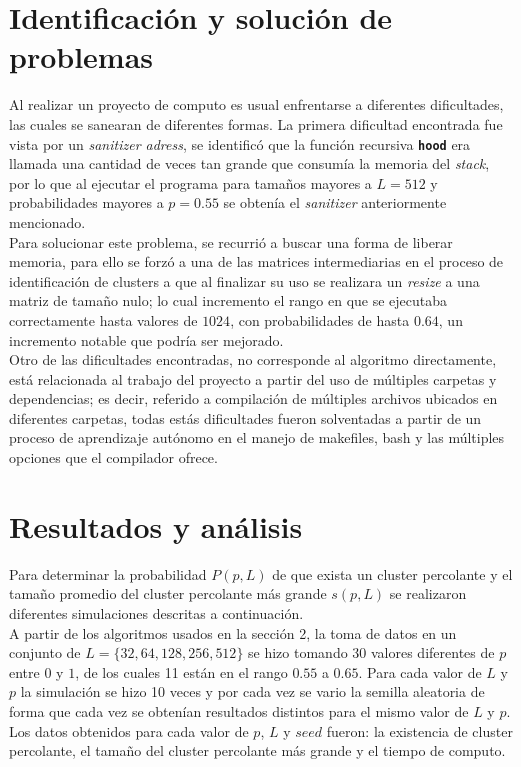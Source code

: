 \documentclass[11pt,twocolumn]{article}
\begin{document}
\section{\textbf{Identificación y solución de problemas}}
 \label{sec:problems}
 Al realizar un proyecto de computo es usual enfrentarse a diferentes dificultades, las cuales se sanearan de diferentes formas. La primera dificultad encontrada fue vista por un \textit{sanitizer adress}, se identificó que la función recursiva \texttt{\textbf{hood}} era llamada una cantidad de veces tan grande que consumía la memoria del \textit{stack}, por lo que al ejecutar el programa para tamaños mayores a $L=512$ y probabilidades mayores a $p=0.55$ se obtenía el \textit{sanitizer} anteriormente mencionado. \\
 Para solucionar este problema, se recurrió a buscar una forma de liberar memoria, para ello se forzó a una de las matrices intermediarias en el proceso de identificación de clusters a que al finalizar su uso se realizara un \textit{resize} a una matriz de tamaño nulo; lo cual incremento el rango en que se ejecutaba correctamente hasta valores de $1024$, con probabilidades de hasta $0.64$, un incremento notable que podría ser mejorado.\\
 Otro de las dificultades encontradas, no corresponde al algoritmo directamente, está relacionada al trabajo del proyecto a partir del uso de múltiples carpetas y dependencias; es decir, referido a compilación de múltiples archivos ubicados en diferentes carpetas, todas estás dificultades fueron solventadas a partir de un proceso de aprendizaje autónomo en el manejo de makefiles, bash y las múltiples opciones que el compilador ofrece.

\section{\textbf{Resultados y análisis}}
Para determinar la probabilidad $P(p,L)$ de que exista un cluster percolante y el tamaño promedio del cluster percolante más grande $s(p,L)$ se realizaron diferentes simulaciones descritas a continuación. \\
A partir de los algoritmos usados en la sección 2, la toma de datos en un conjunto de $L=\{32, 64, 128, 256, 512\}$ se hizo tomando 30 valores diferentes de $p$ entre $0$ y $1$, de los cuales 11 están en el rango $0.55$ a $0.65$. Para cada valor de $L$ y $p$ la simulación se hizo 10 veces y por cada vez se vario la semilla aleatoria de forma que cada vez se obtenían resultados distintos para el mismo valor de $L$ y $p$. Los datos obtenidos para cada valor de $p$, $L$ y $seed$ fueron: la existencia de cluster percolante, el tamaño del cluster percolante más grande y el tiempo de computo.
\end{document}

